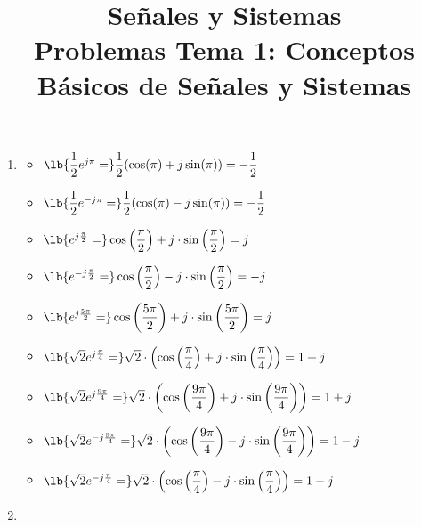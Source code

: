 
\title{Señales y Sistemas\\Problemas Tema 1: Conceptos Básicos de Señales y Sistemas}


\maketitle
\begin{enumerate}[label=\color{red}\textbf{\arabic*)}]
  \item {}
    \begin{multicols}{2}
    \begin{itemize}[label=\color{red}\textbullet, leftmargin=*]
      \item $\lb{\dfrac{1}{2}e^{j\pi} =}\dfrac{1}{2}(\cos(\pi)+j\sin(\pi))=-\dfrac{1}{2}$
      \item $\lb{\dfrac{1}{2}e^{-j\pi} =}\dfrac{1}{2}(\cos(\pi)-j\sin(\pi))=-\dfrac{1}{2}$ 
      \item $\lb{e^{j\frac{\pi}{2} }=} \cos\left( \dfrac{\pi}{2} \right) +j\cdot \sin\left( \dfrac{\pi}{2} \right) =j$ 
      \item $\lb{e^{-j\frac{\pi}{2} } =} \cos\left( \dfrac{\pi}{2} \right) -j\cdot \sin\left( \dfrac{\pi}{2} \right) =-j$ 
      \item $\lb{e^{j\frac{5\pi}{2} } =} \cos\left( \dfrac{5\pi}{2} \right) +j\cdot \sin\left( \dfrac{5\pi}{2} \right) =j$ 
      \item $\lb{\sqrt{2} e^{j\frac{\pi}{4} } =}\sqrt{2}\cdot \left(\cos\left( \dfrac{\pi}{4} \right) +j\cdot \sin\left( \dfrac{\pi}{4} \right)\right) =1+j$ 
      \item $\lb{\sqrt{2} e^{j\frac{9\pi}{4} } =} \sqrt{2}\cdot  \left(\cos\left( \dfrac{9\pi}{4} \right) +j\cdot \sin\left( \dfrac{9\pi}{4} \right) \right)=1+j$ 
      \item $\lb{\sqrt{2} e^{-j\frac{9\pi}{4} } =} \sqrt{2}\cdot  \left(\cos\left( \dfrac{9\pi}{4} \right) -j\cdot \sin\left( \dfrac{9\pi}{4} \right)\right) =1-j$ 
      \item $\lb{\sqrt{2} e^{-j\frac{\pi}{4} } =} \sqrt{2}\cdot  \left(\cos\left( \dfrac{\pi}{4} \right) -j\cdot \sin\left( \dfrac{\pi}{4} \right)\right) =1-j$
    \end{itemize}
  \end{multicols}
  \item {} 

\end{enumerate}
